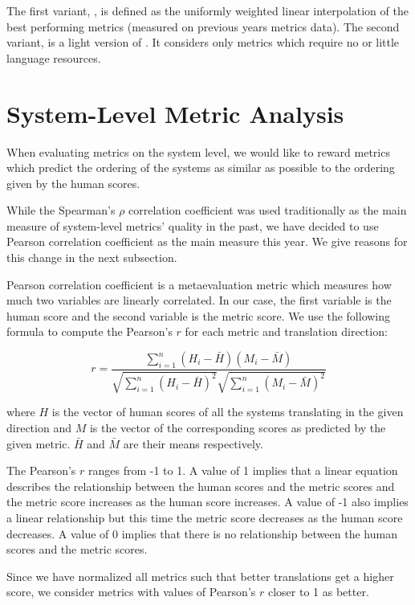 The first variant, , is defined as the uniformly weighted
linear interpolation of the best performing metrics (measured on previous years
metrics data). The second variant,  is a light version of
.  It considers only metrics which require no or little
language resources.


\section{System-Level Metric Analysis}
\label{system-level}

When evaluating metrics on the system level, we would like to reward metrics
which predict the ordering of the systems as similar as possible to the
ordering given by the human scores.

While the Spearman's $\rho$ correlation coefficient was used traditionally as
the main measure of system-level metrics' quality in the past, we have decided
to use Pearson correlation coefficient as the main measure this year. We give
reasons for this change in the next subsection.

Pearson correlation coefficient is a metaevaluation metric which measures how
much two variables are linearly correlated.  In our case, the first variable is
the human score and the second variable is the metric score. We use the
following formula to compute the Pearson's $r$ for each metric and translation
direction:

\begin{equation}
    r = \frac{\sum ^n _{i=1}(H_i - \bar{H})(M_i - \bar{M})}{\sqrt{\sum ^n _{i=1}(H_i - \bar{H})^2} \sqrt{\sum ^n _{i=1}(M_i - \bar{M})^2}} 
\end{equation}

\noindent where $H$ is the vector of human scores of all the systems translating in
the given direction and $M$ is the vector of the corresponding scores as predicted
by the given metric. $\bar{H}$ and $\bar{M}$ are their means respectively.

The Pearson's $r$ ranges from -1 to 1. A value of 1 implies that a linear
equation describes the relationship between the human scores and the metric
scores and the metric score increases as the human score increases. A value of
-1 also implies a linear relationship but this time the metric score decreases
as the human score decreases. A value of 0 implies that there is no
relationship between the human scores and the metric scores.

Since we have normalized all metrics such that better translations get a higher
score, we consider metrics with values of Pearson's $r$ closer to 1 as better. 

